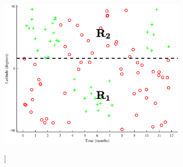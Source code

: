 \documentclass{article}
\begin{document}
\begin{figure}[H]
\centering

\begin{subfigure}[t]{\textwidth}
	\centering
	\begin{minipage}[t]{.35\linewidth}
		\centering
		\includegraphics[width=\linewidth]{ski-split1.eps}
		\caption{}
		\label{fig:step1}
	\end{minipage}
	\begin{minipage}[t]{.6\linewidth}
		\qquad
		\begin{forest}
		[$\text{loc} < 15$, tikz={\draw[{Latex}-, thick] (.north) --++ (0,1);}
	    		[$R_1$]
	    		[$R_2$] 
		] 
		\end{forest}
	\end{minipage}
\end{subfigure}


\end{figure}
\end{document}
